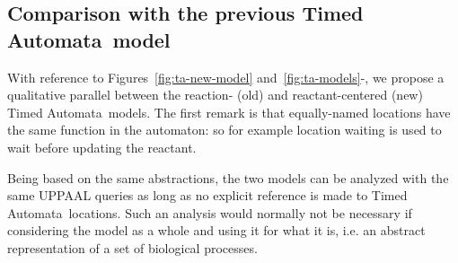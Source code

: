 \documentclass{llncs}
\newcommand{\tas}{Timed Automata}
\begin{document}
\subsection{Comparison with the previous \tas\ model}\label{sec:ta-notes}
With reference to Figures~\ref{fig:ta-new-model} and~\ref{fig:ta-models}{\protect{}\--{}\protect{}},
we propose a qualitative parallel between the reaction- (old) and reactant-centered (new) \tas\ models.
The first remark is that equally-named locations have the same function in the automaton: so for
example location {\sf waiting} is used to wait before updating the reactant.

Being based on the same abstractions, the two models can be analyzed with the same
UPPAAL queries as long as no explicit reference is made to \tas\ locations. Such an analysis
would normally not be necessary if considering the model as a whole and using it for what it is, i.e. an
abstract representation of a set of biological processes.
\end{document}
